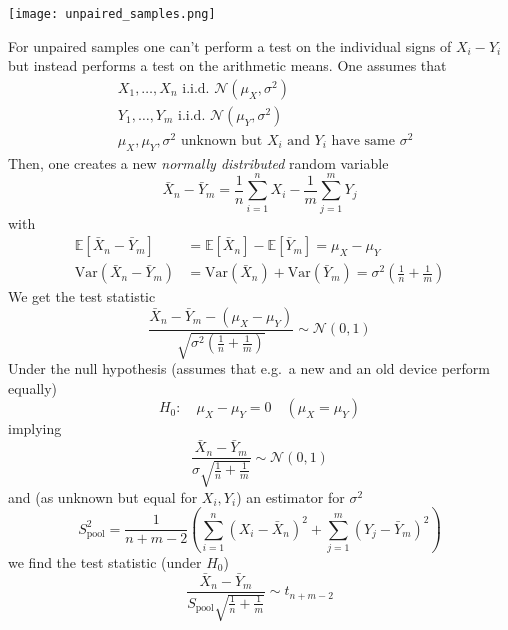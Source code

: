 \begin{center}
    \texttt{[image: unpaired\_samples.png]}
\end{center}

\newpar{}
For unpaired samples one can't perform a test on the individual signs of $X_i-Y_i$ but instead performs a test on the arithmetic means. One assumes that
\begin{align*}
     & X_1,\dots,X_n\text{ i.i.d. }\mathcal{N}(\mu_X,\sigma^2)                       \\
     & Y_1,\dots,Y_m\text{ i.i.d. }\mathcal{N}(\mu_Y,\sigma^2)                       \\
     & \mu_X,\mu_Y,\sigma^2 \text{ unknown but $X_i$ and $Y_i$ have same $\sigma^2$}
\end{align*}
Then, one creates a new \textit{normally distributed} random variable
\begin{equation*}
    \bar{X}_n-\bar{Y}_m=\frac{1}{n}\sum_{i=1}^{n} X_i-\frac{1}{m}\sum_{j=1}^{m} Y_j
\end{equation*}
with
\begin{align*}
    \mathbb{E}[\bar{X}_n-\bar{Y}_m]   & =\mathbb{E}[\bar{X}_n]-\mathbb{E}[\bar{Y}_m]=\mu_X-\mu_Y                                      \\
    \mathrm{Var}(\bar{X}_n-\bar{Y}_m) & =\mathrm{Var}(\bar{X}_n)+\mathrm{Var}(\bar{Y}_m)=\sigma^2\left(\frac{1}{n}+\frac{1}{m}\right)
\end{align*}
We get the test statistic
\begin{equation*}
    \frac{\bar{X}_n-\bar{Y}_m-(\mu_X-\mu_Y)}{\sqrt{\sigma^2\left(\frac{1}{n}+\frac{1}{m}\right)}}\sim\mathcal{N}(0,1)
\end{equation*}
Under the null hypothesis (assumes that e.g.\ a new and an old device perform equally)
\begin{equation*}
    H_0{:}\quad\mu_X-\mu_Y=0\quad(\mu_X=\mu_Y)
\end{equation*}
implying
\begin{equation*}
    \frac{\bar{X}_n-\bar{Y}_m}{\sigma\sqrt{\frac{1}{n}+\frac{1}{m}}}\sim\mathcal{N}(0,1)
\end{equation*}
and (as unknown but equal for $X_i, Y_i$) an estimator for $\sigma^2$
\begin{equation*}
    S_{\text{pool}}^2=\frac{1}{n+m-2}\left(\sum_{i=1}^n(X_i-\bar{X}_n)^2+\sum_{j=1}^m(Y_j-\bar{Y}_m)^2\right)
\end{equation*}
we find the test statistic (under $H_0$)
\begin{equation*}
    \frac{\bar{X}_n-\bar{Y}_m}{S_\text{pool}\sqrt{\frac1n+\frac1m}}\sim t_{n+m-2}
\end{equation*}
